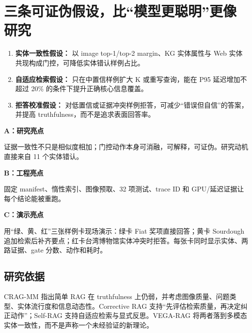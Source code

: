 \documentclass[11pt,a4paper]{ctexart}
\begin{document}
\section{三条可证伪假设，比“模型更聪明”更像研究}

\begin{enumerate}
  \item \textbf{实体一致性假设：} 以 image top-1/top-2 margin、KG 实体属性与 Web 实体共现构成门控，可降低实体错认样例占比。
  \item \textbf{自适应检索假设：} 只在中置信样例扩大 K 或重写查询，能在 P95 延迟增加不超过 20\% 的条件下提升正确核心信息覆盖。
  \item \textbf{拒答校准假设：} 对低置信或证据冲突样例拒答，可减少“错误但自信”的答案，并提高 truthfulness，而不是追求表面回答率。
\end{enumerate}

\begin{minipage}[t]{0.48\textwidth}
\begin{greenbox}
\textbf{A：研究亮点}\par
证据一致性不只是相似度相加；门控动作本身可消融，可解释，可证伪。研究动机直接来自 11 个实体错认。
\end{greenbox}
\end{minipage}
\hfill
\begin{minipage}[t]{0.48\textwidth}
\begin{callout}
\textbf{B：工程亮点}\par
固定 manifest、惰性索引、图像预取、32 项测试、trace ID 和 GPU/延迟证据让每个结论能被重跑。
\end{callout}
\end{minipage}

\begin{tcolorbox}[colback=PaleOrange,colframe=Orange!40,boxrule=.6pt,arc=2mm]
\textbf{C：演示亮点}\par
用“绿、黄、红”三张样例卡现场演示：绿卡 Fiat 奖项直接回答；黄卡 Sourdough 追加检索后补齐要点；红卡台湾博物馆实体冲突时拒答。每张卡同时显示实体、两路证据、gate 分数、动作和耗时。
\end{tcolorbox}

\subsection{研究依据}
\small
CRAG-MM 指出简单 RAG 在 truthfulness 上仍弱，并考虑图像质量、问题类型、实体流行度和信息动态性。Corrective RAG 支持“先评估检索质量，再决定纠正动作”；Self-RAG 支持自适应检索与显式反思。VEGA-RAG 将两者落到多模态实体一致性，而不是声称一个未经验证的新理论。
\clearpage
\end{document}

